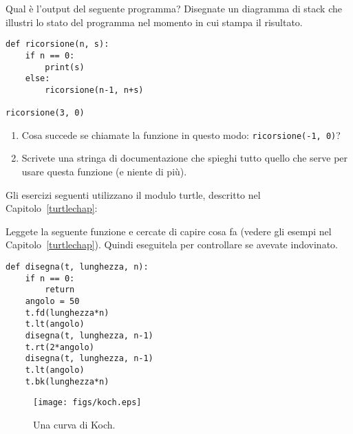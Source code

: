 \documentclass[10pt]{book}
\begin{document}
\vspace{0.2in}
\begin{exercise}

Qual è l'output del seguente programma?
Disegnate un diagramma di stack che illustri lo stato del programma nel momento in cui stampa il risultato.

\begin{verbatim}
def ricorsione(n, s):
    if n == 0:
        print(s)
    else:
        ricorsione(n-1, n+s)

ricorsione(3, 0)
\end{verbatim}

\begin{enumerate}

\item Cosa succede se chiamate la funzione in questo modo: {\tt ricorsione(-1, 0)}?

\item Scrivete una stringa di documentazione che spieghi tutto quello che serve per usare questa funzione (e niente di più).

\end{enumerate}

\end{exercise}

Gli esercizi seguenti utilizzano il modulo turtle, descritto nel Capitolo~\ref{turtlechap}:

\vspace{0.2in}
\begin{exercise}

Leggete la seguente funzione e cercate di capire cosa fa (vedere gli esempi nel Capitolo~\ref{turtlechap}). Quindi eseguitela per controllare se avevate indovinato.

\begin{verbatim}
def disegna(t, lunghezza, n):
    if n == 0:
        return
    angolo = 50
    t.fd(lunghezza*n)
    t.lt(angolo)
    disegna(t, lunghezza, n-1)
    t.rt(2*angolo)
    disegna(t, lunghezza, n-1)
    t.lt(angolo)
    t.bk(lunghezza*n)
\end{verbatim}

\end{exercise}
\begin{figure}
\centerline
{\texttt{[image: figs/koch.eps]}}
\caption{Una curva di Koch.}
\label{fig.koch}
\end{figure}
\end{document}
